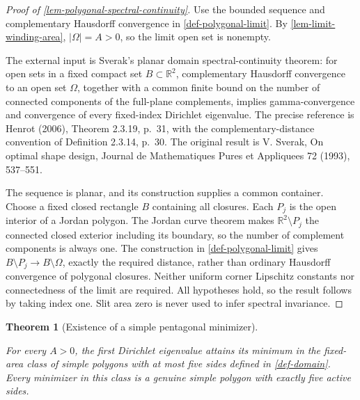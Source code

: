\documentclass[11pt,a4paper]{article}
\theoremstyle{proofmanuscript}
\newtheorem{theorem}{Theorem}[section]
\begin{document}
\begin{proof}[Proof of \ref{lem-polygonal-spectral-continuity}]

Use the bounded sequence and complementary Hausdorff convergence in \ref{def-polygonal-limit}. By \ref{lem-limit-winding-area}, \(|\Omega|=A>0\), so the limit open set is nonempty.

The external input is Sverak's planar domain spectral-continuity theorem: for open sets in a fixed compact set \(B\subset\mathbb R^2\), complementary Hausdorff convergence to an open set \(\Omega\), together with a common finite bound on the number of connected components of the full-plane complements, implies gamma-convergence and convergence of every fixed-index Dirichlet eigenvalue. The precise reference is Henrot (2006), Theorem 2.3.19, p.~31, with the complementary-distance convention of Definition 2.3.14, p.~30. The original result is V. Sverak, On optimal shape design, Journal de Mathematiques Pures et Appliquees 72 (1993), 537--551.

The sequence is planar, and its construction supplies a common container. Choose a fixed closed rectangle \(B\) containing all closures. Each \(P_j\) is the open interior of a Jordan polygon. The Jordan curve theorem makes \(\mathbb R^2\setminus P_j\) the connected closed exterior including its boundary, so the number of complement components is always one. The construction in \ref{def-polygonal-limit} gives \(B\setminus P_j\to B\setminus\Omega\), exactly the required distance, rather than ordinary Hausdorff convergence of polygonal closures. Neither uniform corner Lipschitz constants nor connectedness of the limit are required. All hypotheses hold, so the result follows by taking index one. Slit area zero is never used to infer spectral invariance.

\end{proof}

\begin{theorem}[Existence of a simple pentagonal minimizer]\label{thm-simple-minimizer-exists}

For every \(A>0\), the first Dirichlet eigenvalue attains its minimum in the fixed-area class of simple polygons with at most five sides defined in \ref{def-domain}. Every minimizer in this class is a genuine simple polygon with exactly five active sides.

\end{theorem}
\end{document}
